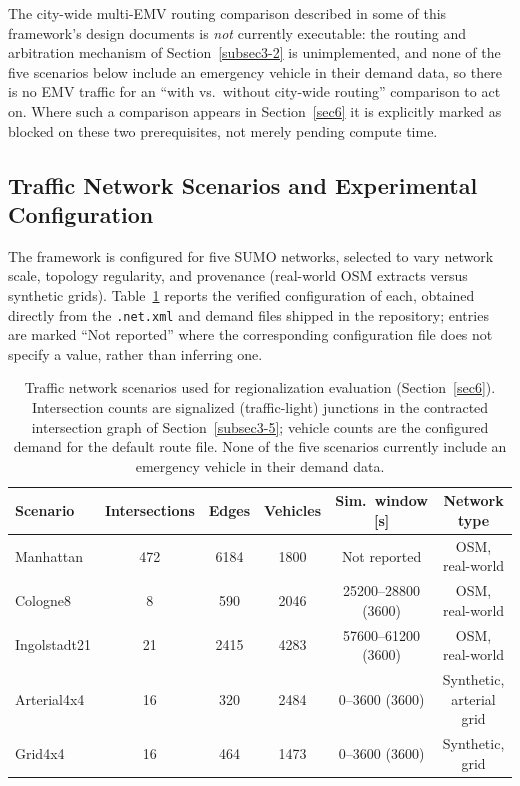 \documentclass[3p,times]{elsarticle}
\theoremstyle{plain}
\theoremstyle{definition}
\begin{document}
The city-wide multi-EMV routing comparison described in some of this
framework's design documents is \emph{not} currently executable: the
routing and arbitration mechanism of Section~\ref{subsec3-2} is
unimplemented, and none of the five scenarios below include an
emergency vehicle in their demand data, so there is no EMV traffic for
an ``with vs.\ without city-wide routing'' comparison to act on. Where
such a comparison appears in Section~\ref{sec6} it is explicitly marked
as blocked on these two prerequisites, not merely pending compute time.

\subsection{Traffic Network Scenarios and Experimental Configuration}\label{subsec5-2b}

The framework is configured for five SUMO networks, selected to vary
network scale, topology regularity, and provenance (real-world OSM
extracts versus synthetic grids). Table~\ref{tab:scenarios} reports
the verified configuration of each, obtained directly from the
\texttt{.net.xml} and demand files shipped in the repository; entries
are marked ``Not reported'' where the corresponding configuration file
does not specify a value, rather than inferring one.

\begin{table}[t]
\centering
\caption{Traffic network scenarios used for regionalization evaluation
(Section~\ref{sec6}). Intersection counts are signalized (traffic-light)
junctions in the contracted intersection graph of
Section~\ref{subsec3-5}; vehicle counts are the configured demand for
the default route file. None of the five scenarios currently include an
emergency vehicle in their demand data.}
\label{tab:scenarios}
\begin{tabular}{lccccc}
\toprule
Scenario & Intersections & Edges & Vehicles & Sim.\ window [s] & Network type \\
\midrule
Manhattan     & 472 & 6184 & 1800 & Not reported   & OSM, real-world \\
Cologne8      & 8   & 590  & 2046 & 25200--28800 (3600) & OSM, real-world \\
Ingolstadt21  & 21  & 2415 & 4283 & 57600--61200 (3600) & OSM, real-world \\
Arterial4x4   & 16  & 320  & 2484 & 0--3600 (3600) & Synthetic, arterial grid \\
Grid4x4       & 16  & 464  & 1473 & 0--3600 (3600) & Synthetic, grid \\
\bottomrule
\end{tabular}
\end{table}
\end{document}
